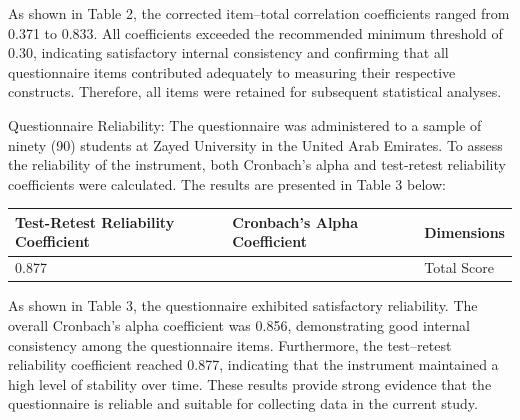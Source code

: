 \documentclass[10pt]{NSP1}
\makeatletter
\newcommand\jltx@wideopen{\par\addvspace{\medskipamount}\noindent}
\newcommand\jltx@wideclose{\par\addvspace{\medskipamount}}
\newenvironment{jltxspan}
  {\if@twocolumn\let\jltx@spannext\strip\else\let\jltx@spannext\jltx@wideopen\fi\jltx@spannext}
  {\if@twocolumn\let\jltx@spanend\endstrip\else\let\jltx@spanend\jltx@wideclose\fi\jltx@spanend}
\newcommand\JLTXaboveplacement{\par\addvspace{6pt plus 2pt minus 2pt}\noindent}
\newcommand\JLTXbelowplacement{\par\addvspace{6pt plus 2pt minus 2pt}}
\makeatother
\begin{document}
As shown in Table 2, the corrected item–total correlation coefficients ranged from 0.371 to 0.833. All coefficients exceeded the recommended minimum threshold of 0.30, indicating satisfactory internal consistency and confirming that all questionnaire items contributed adequately to measuring their respective constructs. Therefore, all items were retained for subsequent statistical analyses.

Questionnaire Reliability: The questionnaire was administered to a sample of ninety (90) students at Zayed University in the United Arab Emirates. To assess the reliability of the instrument, both Cronbach's alpha and test-retest reliability coefficients were calculated. The results are presented in Table 3 below:

\JLTXaboveplacement \begin{jltxspan}%
\noindent\begin{minipage}{\linewidth}%
\centering
{\renewcommand{\arraystretch}{1.54}\small
\begin{tabular}{|>{\centering\arraybackslash}p{}|>{\centering\arraybackslash}p{}|>{\centering\arraybackslash}p{}|}
\hline
\cellcolor[HTML]{DDD9C3}\textbf{Test-Retest Reliability Coefficient} & \cellcolor[HTML]{DDD9C3}\textbf{Cronbach's Alpha Coefficient} & \cellcolor[HTML]{DDD9C3}\textbf{Dimensions} \\
\hline
\cellcolor[HTML]{DDD9C3}0.877 & 0.856 & Total Score \\
\hline
\end{tabular}}
%
\end{minipage}%
\end{jltxspan}\JLTXbelowplacement 

As shown in Table 3, the questionnaire exhibited satisfactory reliability. The overall Cronbach's alpha coefficient was 0.856, demonstrating good internal consistency among the questionnaire items. Furthermore, the test–retest reliability coefficient reached 0.877, indicating that the instrument maintained a high level of stability over time. These results provide strong evidence that the questionnaire is reliable and suitable for collecting data in the current study.

\par\medskip{}\smallskip
\end{document}
